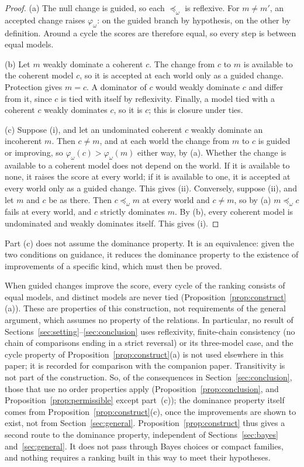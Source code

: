\documentclass[11pt]{article}
\theoremstyle{definition}
\theoremstyle{remark}
\begin{document}
\begin{proof}
(a) The null change is guided, so each $\preceq_\omega$ is reflexive. For $m\ne m'$, an accepted change raises $\varphi_\omega$: on the guided branch by hypothesis, on the other by definition. Around a cycle the scores are therefore equal, so every step is between equal models.

(b) Let $m$ weakly dominate a coherent $c$. The change from $c$ to $m$ is available to the coherent model $c$, so it is accepted at each world only as a guided change. Protection gives $m=c$. A dominator of $c$ would weakly dominate $c$ and differ from it, since $c$ is tied with itself by reflexivity. Finally, a model tied with a coherent $c$ weakly dominates $c$, so it is $c$; this is closure under ties.

(c) Suppose (i), and let an undominated coherent $c$ weakly dominate an incoherent $m$. Then $c\ne m$, and at each world the change from $m$ to $c$ is guided or improving, so $\varphi_\omega(c)>\varphi_\omega(m)$ either way, by (a). Whether the change is available to a coherent model does not depend on the world. If it is available to none, it raises the score at every world; if it is available to one, it is accepted at every world only as a guided change. This gives (ii). Conversely, suppose (ii), and let $m$ and $c$ be as there. Then $c\preceq_\omega m$ at every world and $c\ne m$, so by (a) $m\preceq_\omega c$ fails at every world, and $c$ strictly dominates $m$. By (b), every coherent model is undominated and weakly dominates itself. This gives (i).
\end{proof}

Part (c) does not assume the dominance property. It is an equivalence: given the two conditions on guidance, it reduces the dominance property to the existence of improvements of a specific kind, which must then be proved.

When guided changes improve the score, every cycle of the ranking consists of equal models, and distinct models are never tied (Proposition~\ref{prop:construct}(a)). These are properties of this construction, not requirements of the general argument, which assumes no property of the relations. In particular, no result of Sections~\ref{sec:setting}--\ref{sec:conclusion} uses reflexivity, finite-chain consistency (no chain of comparisons ending in a strict reversal) or its three-model case, and the cycle property of Proposition~\ref{prop:construct}(a) is not used elsewhere in this paper; it is recorded for comparison with the companion paper. Transitivity is not part of the construction. So, of the consequences in Section~\ref{sec:conclusion}, those that use no order properties apply (Proposition~\ref{prop:conclusion}, and Proposition~\ref{prop:permissible} except part~(c)); the dominance property itself comes from Proposition~\ref{prop:construct}(c), once the improvements are shown to exist, not from Section~\ref{sec:general}. Proposition~\ref{prop:construct} thus gives a second route to the dominance property, independent of Sections~\ref{sec:bayes} and~\ref{sec:general}. It does not pass through Bayes choices or compact families, and nothing requires a ranking built in this way to meet their hypotheses.
\end{document}

